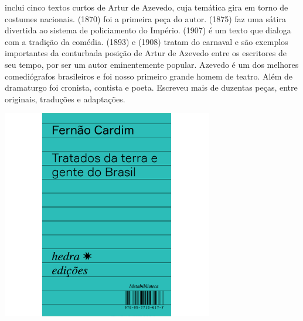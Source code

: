 \hspace*{-7cm}\hrulefill\hspace*{-7cm}

\medskip

 inclui cinco textos curtos de Artur de Azevedo, cuja temática gira em torno de costumes nacionais. {} (1870) foi a primeira peça do autor. {} (1875) faz uma sátira divertida ao sistema de policiamento do Império. {} (1907) é um texto que dialoga com a tradição da comédia. {} (1893) e {} (1908) tratam do carnaval e são exemplos importantes da conturbada posição de Artur de Azevedo entre os escritores de seu tempo, por ser um autor eminentemente popular. Azevedo é um dos melhores comediógrafos brasileiros e foi nosso primeiro grande homem de teatro. Além de dramaturgo foi cronista, contista e poeta. Escreveu mais de duzentas peças, entre originais, traduções e adaptações.


\vfill

\hspace*{-.4cm}\begin{minipage}[c]{.5\linewidth}
\small{
{}}
\end{minipage}

\pagebreak

\hspace{.5cm}

\begin{center}
\hspace*{-2.5cm}
\hspace*{2.5cm}\includegraphics[width=92mm]{./grid/cardim.jpg}
\end{center}

